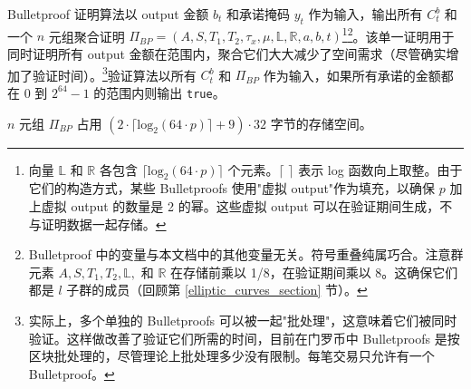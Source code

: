Bulletproof 证明算法以 output 金额 $b_t$ 和承诺掩码 $y_t$ 作为输入，输出所有 $C^b_t$ 和一个 $n$ 元组聚合证明 $\Pi_{BP} = (A, S, T_1, T_2, \tau_x, \mu, \mathbb{L}, \mathbb{R}, a, b, t)$\footnote{向量 $\mathbb{L}$ 和 $\mathbb{R}$ 各包含 $\lceil \textrm{log}_2(64 \cdot p) \rceil$ 个元素。$\lceil$ $\rceil$ 表示 log 函数向上取整。由于它们的构造方式，某些 Bulletproofs 使用"虚拟 output"作为填充，以确保 $p$ 加上虚拟 output 的数量是 2 的幂。这些虚拟 output 可以在验证期间生成，不与证明数据一起存储。}\footnote{Bulletproof 中的变量与本文档中的其他变量无关。符号重叠纯属巧合。注意群元素 $A, S, T_1, T_2, \mathbb{L},$ 和 $\mathbb{R}$ 在存储前乘以 1/8，在验证期间乘以 8。这确保它们都是 $l$ 子群的成员（回顾第 \ref{elliptic_curves_section} 节）。}。该单一证明用于同时证明所有 output 金额在范围内，聚合它们大大减少了空间需求（尽管确实增加了验证时间）。\footnote{实际上，多个单独的 Bulletproofs 可以被一起"批处理"，这意味着它们被同时验证。这样做改善了验证它们所需的时间，目前在门罗币中 Bulletproofs 是按区块批处理的，尽管理论上批处理多少没有限制。每笔交易只允许有一个 Bulletproof。}验证算法以所有 $C^b_t$ 和 $\Pi_{BP}$ 作为输入，如果所有承诺的金额都在 0 到 $2^{64} - 1$ 的范围内则输出 {\tt true}。

$n$ 元组 $\Pi_{BP}$ 占用 $(2 \cdot \lceil \textrm{log}_2(64 \cdot p) \rceil + 9) \cdot 32$ 字节的存储空间。